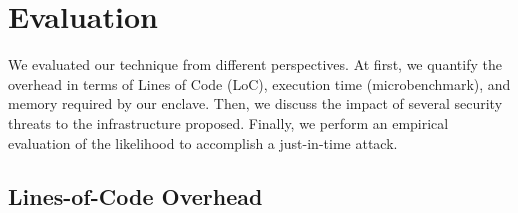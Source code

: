 %

\section{Evaluation}
\label{sec:experiment}

We evaluated our technique from different perspectives.
At first, we quantify the overhead in terms of Lines of Code (LoC), execution 
time (microbenchmark), and memory required by our enclave.
Then, we discuss the impact of several security threats to the infrastructure 
proposed.
Finally, we perform an empirical evaluation of the likelihood to accomplish a 
just-in-time attack.

\subsection{Lines-of-Code Overhead}

